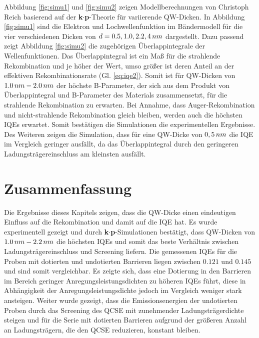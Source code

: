 \noindent 
Abbildung \ref{fig:simu1} und \ref{fig:simu2} zeigen Modellberechnungen von Christoph Reich basierend auf der \textbf{k$\cdot$p}-Theorie für variierende QW-Dicken. In Abbildung \ref{fig:simu1} sind die Elektron und Lochwellenfunktion im Bändermodell für die vier verschiedenen Dicken von 
$d=0.5,1.0,2.2,4 \thinspace nm$ dargestellt. 
\newline
Dazu passend zeigt Abbildung \ref{fig:simu2} die zugehörigen Überlappintegrale der Wellenfunktionen.
Das Überlappintegral ist ein Maß für die strahlende Rekombination und je höher der Wert, umso größer ist deren Anteil an der effektiven Rekombinationsrate (Gl. \ref{eq:iqe2}). 
\newline
Somit ist für QW-Dicken von $1.0 \thinspace nm- 2.0 \thinspace nm$ der höchste B-Parameter, der sich aus dem Produkt von Überlappintegral und B-Parameter des Materials zusammensetzt, für die strahlende Rekombination zu erwarten. Bei Annahme, dass Auger-Rekombination und nicht-strahlende Rekombination gleich bleiben, werden auch die höchsten IQEs erwartet. Somit bestätigen die Simulationen die experimentellen Ergebnisse.
\newline
Des Weiteren zeigen die Simulation, dass für eine QW-Dicke von $0,5 \thinspace nm$ die IQE im Vergleich geringer ausfällt, da das Überlappintegral durch den geringeren Ladungsträgereinschluss am kleinsten ausfällt. 

\section{Zusammenfassung}

Die Ergebnisse dieses Kapitels zeigen, dass die QW-Dicke einen eindeutigen Einfluss auf die Rekombination und damit auf die IQE hat. Es wurde experimentell gezeigt und durch \textbf{k$\cdot$p}-Simulationen bestätigt, dass QW-Dicken von $1.0 \thinspace nm- 2.2 \thinspace nm$ die höchsten IQEs und somit das beste Verhältnis zwischen Ladungsträgereinschluss und Screening liefern.
\newline
Die gemessenen IQEs für die Proben mit dotierten und undotierten Barrieren liegen zwischen $0.121$ und $0.145$ und sind somit vergleichbar. Es zeigte sich, dass eine Dotierung in den Barrieren im Bereich geringer Anregungsleistungsdichten zu höheren IQEs führt, diese in Abhängigkeit der Anregungsleistungsdichte jedoch im Vergleich weniger stark ansteigen.
\newline
Weiter wurde gezeigt, dass die Emissionsenergien der undotierten Proben durch das Screening des QCSE mit zunehmender Ladungsträgerdichte steigen und für die Serie mit dotierten Barrieren aufgrund der größeren Anzahl an Ladungsträgern, die den QCSE reduzieren, konstant bleiben.
